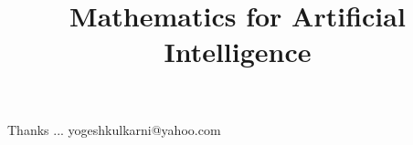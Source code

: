 \documentclass[xcolor=dvipsnames,compress,t,pdf,notes,9pt]{beamer}
\title[\insertframenumber /\inserttotalframenumber]{Mathematics for Artificial Intelligence}
\begin{document}
	\begin{frame}
	\titlepage
	\end{frame}
	
	

	\begin{frame}[c]{}
	Thanks ...
	\vspace{5mm}
	yogeshkulkarni@yahoo.com
	\end{frame}
\end{document}
